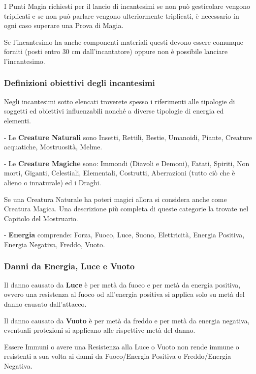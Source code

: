 \begin{multicols}{2}
I Punti Magia richiesti per il lancio di incantesimi se non può gesticolare vengono triplicati e se non può parlare vengono ulteriormente triplicati, è necessario in ogni caso superare una Prova di Magia.

Se l'incantesimo ha anche componenti materiali questi devono essere comunque forniti (posti entro 30 cm dall'incantatore) oppure non è possibile lanciare l'incantesimo.

\subsubsection{Definizioni obiettivi degli incantesimi}\label{magiedefinizioniobiettivi}

Negli incantesimi sotto elencati troverete spesso i riferimenti alle tipologie di soggetti ed obiettivi influenzabili nonché a diverse tipologie di energia ed elementi.

- Le \textbf{Creature Naturali} sono Insetti, Rettili, Bestie, Umanoidi, Piante, Creature acquatiche, Mostruosità, Melme.

- Le \textbf{Creature Magiche} sono: Immondi (Diavoli e Demoni), Fatati, Spiriti, Non morti, Giganti, Celestiali, Elementali, Costrutti, Aberrazioni (tutto ciò che è alieno o innaturale) ed i Draghi.

Se una Creatura Naturale ha poteri magici allora si considera anche come Creatura Magica. Una descrizione più completa di queste categorie la trovate nel Capitolo del Mostruario.

- \textbf{Energia} comprende: Forza, Fuoco, Luce, Suono, Elettricità, Energia Positiva, Energia Negativa, Freddo, Vuoto.\label{elencoenergia}\hypertarget{elencoenergia}{}

\subsubsection{Danni da Energia, Luce e Vuoto}

Il danno causato da \textbf{Luce} è per metà da fuoco e per metà da energia positiva, ovvero una resistenza al fuoco od all'energia positiva si applica solo su metà del danno causato dall'attacco.

Il danno causato da \textbf{Vuoto} è per metà da freddo e per metà da energia negativa, eventuali protezioni si applicano alle rispettive metà del danno.

Essere Immuni o avere una Resistenza alla Luce o Vuoto non rende immune o resistenti a sua volta ai danni da Fuoco/Energia Positiva o Freddo/Energia Negativa.


\end{multicols}
